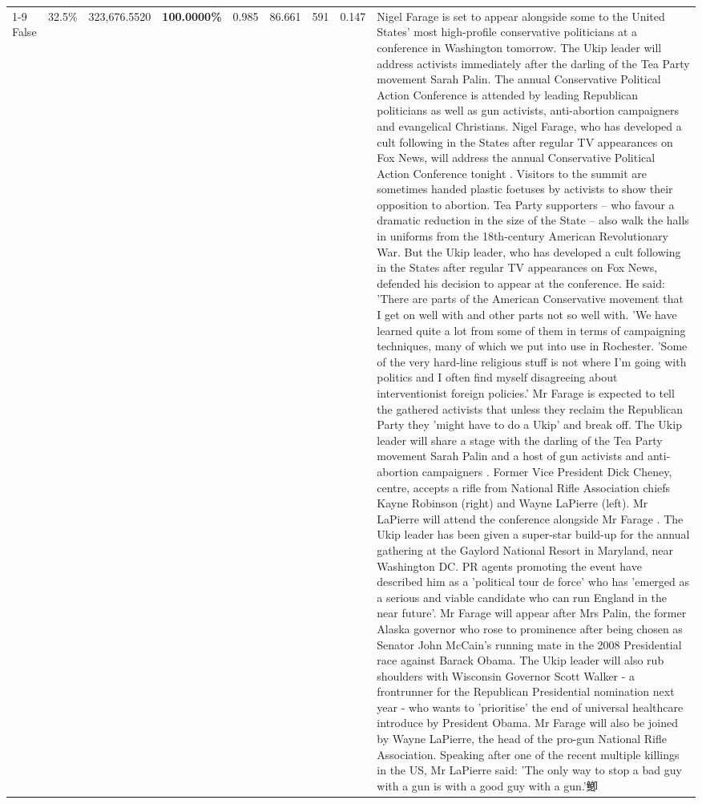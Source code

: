 \begin{table}[H]
\begin{tabular}{lllrlllll}
\cline{1-9} \cline{2-9}
False & 32.5\% & 323,676.5520 & \bfseries \color{red} 100.0000\% & 0.985 & 86.661 & 591 & 0.147 & Nigel Farage is set to appear alongside some to the United States' most high-profile conservative politicians at a conference in Washington tomorrow. The Ukip leader will address activists immediately after the darling of the Tea Party movement Sarah Palin. The annual Conservative Political Action Conference is attended by leading Republican politicians as well as gun activists, anti-abortion campaigners and evangelical Christians. Nigel Farage, who has developed a cult following in the States after regular TV appearances on Fox News, will address the annual Conservative Political Action Conference tonight . Visitors to the summit are sometimes handed plastic foetuses by activists to show their opposition to abortion. Tea Party supporters – who favour a dramatic reduction in the size of the State – also walk the halls in uniforms from the 18th-century American Revolutionary War. But the Ukip leader, who has developed a cult following in the States after regular TV appearances on Fox News, defended his decision to appear at the conference. He said: 'There are parts of the American Conservative movement that I get on well with and other parts not so well with. 'We have learned quite a lot from some of them in terms of campaigning techniques, many of which we put into use in Rochester. 'Some of the very hard-line religious stuff is not where I'm going with politics and I often find myself disagreeing about interventionist foreign policies.' Mr Farage is expected to tell the gathered activists that unless they reclaim the Republican Party they 'might have to do a Ukip' and break off. The Ukip leader will share a stage with the darling of the Tea Party movement Sarah Palin and a host of gun activists and anti-abortion campaigners . Former Vice President Dick Cheney, centre, accepts a rifle from National Rifle Association chiefs Kayne Robinson (right) and Wayne LaPierre (left). Mr LaPierre will attend the conference alongside Mr Farage . The Ukip leader has been given a super-star build-up for the annual gathering at the Gaylord National Resort in Maryland, near Washington DC. PR agents promoting the event have described him as a 'political tour de force' who has 'emerged as a serious and viable candidate who can run England in the near future'. Mr Farage will appear after Mrs Palin, the former Alaska governor who rose to prominence after being chosen as Senator John McCain's running mate in the 2008 Presidential race against Barack Obama. The Ukip leader will also rub shoulders with Wisconsin Governor Scott Walker - a frontrunner for the Republican Presidential nomination next year - who wants to 'prioritise' the end of universal healthcare introduce by President Obama. Mr Farage will also be joined by Wayne LaPierre, the head of the pro-gun National Rifle Association. Speaking after one of the recent multiple killings in the US, Mr LaPierre said: 'The only way to stop a bad guy with a gun is with a good guy with a gun.'鯽 \\

\end{tabular}
\end{table}
